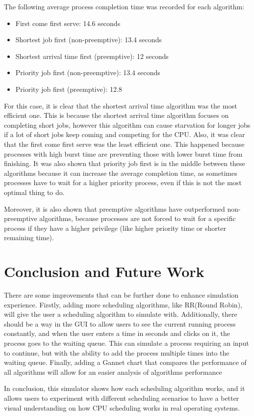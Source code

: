 \documentclass{article}
\begin{document}
The following average process completion time was recorded for each algorithm:

\begin{itemize}
    \item First come first serve: 14.6 seconds
    \item Shortest job first (non-preemptive): 13.4 seconds
    \item Shortest arrival time first (preemptive): 12 seconds
    \item Priority job first (non-preemptive): 13.4 seconds
    \item Priority job first (preemptive):  12.8
\end{itemize}

For this case, it is clear that the shortest arrival time algorithm was the most efficient one. This is because the shortest arrival time algorithm focuses on completing short jobs, however this algorithm can cause starvation for longer jobs if a lot of short jobs keep coming and competing for the CPU. Also, it was clear that the first come first serve was the least efficient one. This happened because processes with high burst time are preventing those with lower burst time from finishing. It was also shown that priority job first is in the middle between these algorithms because it can increase the average completion time, as sometimes processes have to wait for a higher priority process, even if this is not the most optimal thing to do.

Moreover, it is also shown that preemptive algorithms have outperformed non-preemptive algorithms, because processes are not forced to wait for a specific process if they have a higher privilege (like higher priority time or shorter remaining time).



\section{Conclusion and Future Work}
 There are some improvements that can be further done to enhance simulation experience. Firstly, adding more scheduling algorithms, like RR(Round Robin), will give the user a scheduling algorithm to simulate with. Additionally, there should be a way in the GUI to allow users to see the current running process constantly, and when the user enters a time in seconds and clicks on it, the process goes to the waiting queue. This can simulate a process requiring an input to continue, but with the ability to add the process multiple times into the waiting queue. Finally, adding a Gannet chart that compares the performance of all algorithms will allow for an easier analysis of algorithms performance
 
 In conclusion, this simulator shows how each scheduling algorithm works, and it allows users to experiment with different scheduling scenarios to have a better visual understanding on how CPU scheduling works in real operating systems.
\end{document}

